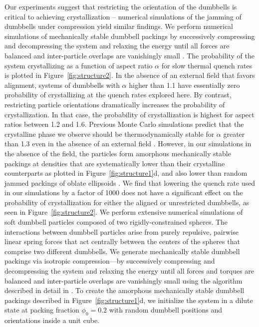  Our experiments suggest that restricting the orientation of the dumbbells is critical to achieving crystallization -- numerical simulations of the jamming of dumbbells under compression yield similar findings.
 We perform numerical simulations of mechanically stable dumbbell packings by successively compressing and decompressing the system and relaxing the energy until all forces are balanced and inter-particle overlaps are vanishingly small \cite{Gao2006}.
 The probability of the system crystallizing as a function of aspect ratio $\alpha$ for slow thermal quench rates is plotted in Figure~\ref{fig:structure2}.
 In the absence of an external field that favors alignment, systems of dumbbells with $\alpha$ higher than 1.1 have essentially zero probability of crystallizing at the quench rates explored here.
  By contrast, restricting particle orientations dramatically increases the probability of crystallization.
 In that case, the probability of crystallization is highest for aspect ratios between 1.2 and 1.6.
 Previous Monte Carlo simulations predict that the crystalline phase we observe should be thermodynamically stable for $\alpha$ greater than 1.3 even in the absence of an external field \cite{Vega1992b}.
 However, in our simulations in the absence of the field, the particles form amorphous mechanically stable packings at densities that are systematically lower than their crystalline counterparts as plotted in Figure~\ref{fig:structure1}d, and also lower than random jammed packings of oblate ellipsoids \cite{Donev2004, Donev2004b}.
 We find that lowering the quench rate used in our simulations by a factor of 1000 does not have a significant effect on the probability of crystallization for either the aligned or unrestricted dumbbells, as seen in Figure~\ref{fig:structure2}.
  We perform extensive numerical simulations of soft dumbbell particles composed of two rigidly-constrained spheres.
 The interactions between dumbbell particles arise from purely repulsive, pairwise linear spring forces that act centrally between the centers of the spheres that comprise two different dumbbells.
 We generate mechanically stable dumbbell packings via isotropic compression---by successively compressing and decompressing the system and relaxing the energy until all forces and torques are balanced and inter-particle overlaps are vanishingly small using the algorithm described in detail in \cite{Gao2006}.
 To create the amorphous mechanically stable dumbbell packings described in Figure~\ref{fig:structure1}d, we initialize the system in a dilute state at packing fraction $\phi_0=0.2$ with random dumbbell positions and orientations inside a unit cube.
